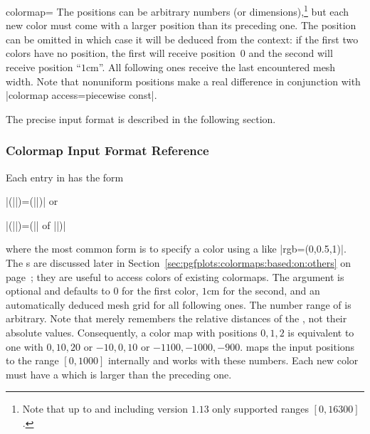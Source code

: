 \begin{pgfplotskey}{colormap=}
    The positions can be arbitrary numbers (or dimensions),\footnote{Note that
    \PGFPlots{} up to and including version $1.13$ only supported ranges
    $[0,16300]$.} but each new color must come with a larger position than its
    preceding one. The position can be omitted in which case it will be deduced
    from the context: if the first two colors have no position, the first will
    receive position~$0$ and the second will receive position ``$1\text{cm}$''.
    All following ones receive the last encountered mesh width. Note that
    nonuniform positions make a real difference in conjunction with
    |colormap access=piecewise const|.

    The precise input format is described in the following section.


    \subsubsection{Colormap Input Format Reference}
    \label{sec:colormap:input:format}

    Each entry in  has the form

    |(||)=(||)| or

    |(||)=(|| of ||)|

    where the most common form is to specify a color using a 
    like |rgb=(0,0.5,1)|. The s are discussed later in
    Section~\ref{sec:pgfplots:colormaps:based:on:others} on
    page~\pageref{sec:pgfplots:colormaps:based:on:others}; they are useful to
    access colors of existing colormaps. The  argument is
    optional and defaults to $0$ for the first color, $1\text{cm}$ for the
    second, and an automatically deduced mesh grid for all following ones. The
    number range of  is arbitrary. Note that \PGFPlots{} merely
    remembers the relative distances of the , not their
    absolute values. Consequently, a color map with positions $0,1,2$ is
    equivalent to one with $0,10,20$ or $-10,0,10$ or $-1100,-1000,-900$.
    \PGFPlots{} maps the input positions to the range $[0,1000]$ internally and
    works with these numbers. Each new color must have a  which
    is larger than the preceding one.


\end{pgfplotskey}
